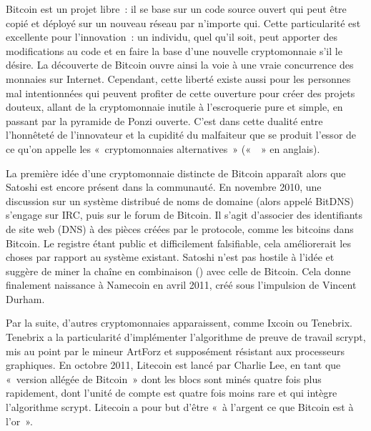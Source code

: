 Bitcoin est un projet libre~: il se base sur un code source ouvert qui peut être copié et déployé sur un nouveau réseau par n'importe qui. Cette particularité est excellente pour l'innovation~: un individu, quel qu'il soit, peut apporter des modifications au code et en faire la base d'une nouvelle cryptomonnaie s'il le désire. La découverte de Bitcoin ouvre ainsi la voie à une vraie concurrence des monnaies sur Internet. Cependant, cette liberté existe aussi pour les personnes mal intentionnées qui peuvent profiter de cette ouverture pour créer des projets douteux, allant de la cryptomonnaie inutile à l'escroquerie pure et simple, en passant par la pyramide de Ponzi ouverte. C'est dans cette dualité entre l'honnêteté de l'innovateur et la cupidité du malfaiteur que se produit l'essor de ce qu'on appelle les «~cryptomonnaies alternatives~» («~~» en anglais).

La première idée d'une cryptomonnaie distincte de Bitcoin apparaît alors que Satoshi est encore présent dans la communauté. En novembre 2010, une discussion sur un système distribué de noms de domaine (alors appelé BitDNS) s'engage sur IRC, puis sur le forum de Bitcoin. Il s'agit d'associer des identifiants de site web (DNS) à des pièces créées par le protocole, comme les bitcoins dans Bitcoin. Le registre étant public et difficilement falsifiable, cela améliorerait les choses par rapport au système existant. Satoshi n'est pas hostile à l'idée et suggère de miner la chaîne en combinaison () avec celle de Bitcoin. Cela donne finalement naissance à Namecoin en avril 2011, créé sous l'impulsion de Vincent Durham.

Par la suite, d'autres cryptomonnaies apparaissent, comme Ixcoin ou Tenebrix. Tenebrix a la particularité d'implémenter l'algorithme de preuve de travail scrypt, mis au point par le mineur ArtForz et supposément résistant aux processeurs graphiques. En octobre 2011, Litecoin est lancé par Charlie Lee, en tant que «~version allégée de Bitcoin~» dont les blocs sont minés quatre fois plus rapidement, dont l'unité de compte est quatre fois moins rare et qui intègre l'algorithme scrypt. Litecoin a pour but d'être «~à l'argent ce que Bitcoin est à l'or~».

